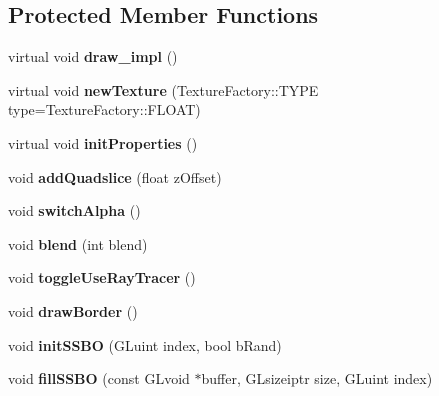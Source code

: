 \subsection*{Protected Member Functions}
\begin{DoxyCompactItemize}
\item 
virtual void {\bfseries draw\-\_\-impl} ()\label{classSoundfieldViewer_1_1FieldViewerBase_a402b91f7f7f42b5a61083b5cc0fd8c1f}

\item 
virtual void {\bfseries new\-Texture} (Texture\-Factory\-::\-T\-Y\-P\-E type=Texture\-Factory\-::\-F\-L\-O\-A\-T)\label{classSoundfieldViewer_1_1FieldViewerBase_a11916f73c50c9dbf79886e14191058df}

\item 
virtual void {\bfseries init\-Properties} ()\label{classSoundfieldViewer_1_1FieldViewerBase_a455a25f4321e01117b38c44733779cfe}

\item 
void {\bfseries add\-Quadslice} (float z\-Offset)\label{classSoundfieldViewer_1_1FieldViewerBase_a12fb17013d327b9300133ae5ee4db52d}

\item 
void {\bfseries switch\-Alpha} ()\label{classSoundfieldViewer_1_1FieldViewerBase_a5692d0f00d69b779f274a4885f21b62c}

\item 
void {\bfseries blend} (int blend)\label{classSoundfieldViewer_1_1FieldViewerBase_a3f9fd03788a6661edcbb733500359d59}

\item 
void {\bfseries toggle\-Use\-Ray\-Tracer} ()\label{classSoundfieldViewer_1_1FieldViewerBase_ad6f1d3ddecf9ae8653038c6a9469f2a3}

\item 
void {\bfseries draw\-Border} ()\label{classSoundfieldViewer_1_1FieldViewerBase_a63e63af0a109a3888d2fa2f6250fc59b}

\item 
void {\bfseries init\-S\-S\-B\-O} (G\-Luint index, bool b\-Rand)\label{classSoundfieldViewer_1_1FieldViewerBase_a051ef7b731dfc1c6d113a3fbc7526fc3}

\item 
void {\bfseries fill\-S\-S\-B\-O} (const G\-Lvoid $\ast$buffer, G\-Lsizeiptr size, G\-Luint index)\label{classSoundfieldViewer_1_1FieldViewerBase_a1355298deec868131eacc7d9e2f3e6cc}

\end{DoxyCompactItemize}
